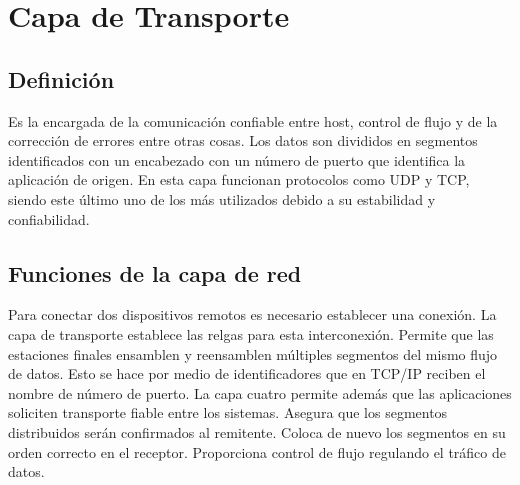 \documentclass[12pt, fleqn]{report}                             %
\theoremstyle{break}                                            %
\begin{document}
    \clearpage
    \chapter{Capa de Transporte}

        \clearpage
        \section{Definición}

            Es la encargada de la comunicación confiable entre host, control de flujo y de la corrección
            de errores entre otras cosas. Los datos son divididos en segmentos identificados con un 
            encabezado con un número de puerto que identifica la aplicación de origen. En esta capa
            funcionan protocolos como UDP y TCP, siendo este último uno de los más utilizados debido 
            a su estabilidad y confiabilidad.

        \vspace{1em}
        \section{Funciones de la capa de red}

            Para conectar dos dispositivos remotos es necesario establecer una conexión. La capa de
            transporte establece las relgas para esta interconexión. Permite que las estaciones finales
            ensamblen y reensamblen múltiples segmentos del mismo flujo de datos. Esto se hace por medio 
            de identificadores que en TCP/IP reciben el nombre de número de puerto. La capa cuatro permite
            además que las aplicaciones soliciten transporte fiable entre los sistemas. Asegura que los
            segmentos distribuidos serán confirmados al remitente. Coloca de nuevo los segmentos en su
            orden correcto en el receptor. Proporciona control de flujo regulando el tráfico de datos.
\end{document}
